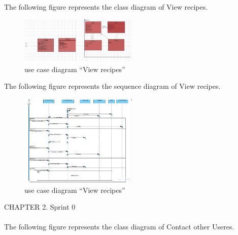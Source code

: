 \documentclass{article}
\begin{document}
{{{{{{{{The following figure represents the class diagram of View recipes.\\

\begin{figure}[htbp]
    \centering
    \includegraphics[width=0.5\textwidth]{ViewRecipeCLASS}
    \caption{use case diagram “View recipes”}
    \label{fig:design2}
\end{figure}
The following figure represents the sequence diagram of View recipes.\\
\begin{figure}[htbp]
    \centering
    \includegraphics[width=0.5\textwidth]{ViewRECIPE2}
    \caption{use case diagram “View recipes”}
    \label{fig:design2}
\end{figure}
\newpage
\noindent
CHAPTER 2.  Sprint 0 \\
\underline{\hspace{\textwidth}} \vspace{0.2cm}\\
The following figure represents the class diagram of Contact other Useres.\\

}}}}}}}}
\end{document}

